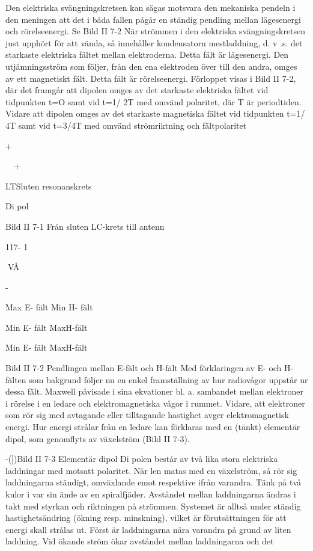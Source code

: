 Den elektriska svängningskretsen kan sägas motsvara den mekaniska pendeln i den
meningen att det i båda fallen pågår en
ständig pendling mellan lägesenergi och rörelseenergi. Se Bild II 7-2
När strömmen i den elektriska svängningskretsen just upphört för att vända, så
innehåller kondensatorn mestladdning, d. v .s.
det starkaste elektriska fältet mellan elektroderna. Detta fält är lägesenergi. Den utjämningsström som följer, från den ena elektroden över till den andra, omges av ett
magnetiskt fält. Detta fält är rörelseenergi.
Förloppet visas i Bild II 7-2, där det framgår att dipolen omges av det starkaste elektriska fältet vid tidpunkten t=O samt vid t=1/
2T med omvänd polaritet, där T är periodtiden. Vidare att dipolen omges av det starkaste magnetiska fältet vid tidpunkten t=1/
4T samt vid t=3/4T med omvänd strömriktning och fältpolaritet

+

~~+

LTSluten
resonanskrets

Di pol

Bild II 7-1 Från sluten LC-krets till antenn

117- 1

VÅ

-

Max E- fält
Min H- fält

Min E- fält
MaxH-fält

Min E- fält
MaxH-fält

Bild II 7-2 Pendlingen mellan E-fält och H-fält
Med förklaringen av E- och H-fälten som
bakgrund följer nu en enkel framställning av
hur radiovågor uppstår ur dessa fält.
Maxwell påvisade i sina ekvationer bl. a.
sambandet mellan elektroner i rörelse i en
ledare och elektromagnetiska vågor i rummet. Vidare, att elektroner som rör sig med
avtagande eller tilltagande hastighet avger
elektromagnetisk energi.
Hur energi strålar från en ledare kan förklaras med en (tänkt) elementär dipol, som
genomflyts av växelström (Bild II 7-3).

-(])Bild II 7-3 Elementär dipol
Di polen består av två lika stora elektriska
laddningar med motsatt polaritet. När
len matas med en växelström, så rör sig
laddningarna ständigt, omväxlande emot
respektive ifrån varandra. Tänk på två kulor
i var sin ände av en spiralfjäder. Avståndet
mellan laddningarna ändras i takt med styrkan och riktningen på strömmen. Systemet
är alltså under ständig hastighetsändring
(ökning resp. minskning), vilket är förutsättningen för att energi skall strålas ut.
Först är laddningarna nära varandra på
grund av liten laddning. Vid ökande ström
ökar avståndet mellan laddningarna och det


